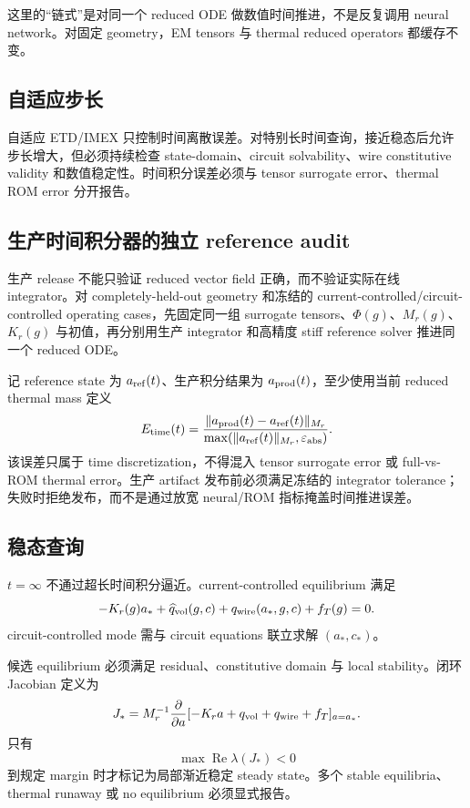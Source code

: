 这里的“链式”是对同一个 reduced ODE 做数值时间推进，不是反复调用 neural network。对固定 geometry，EM tensors 与 thermal reduced operators 都缓存不变。

\subsection{自适应步长}
自适应 ETD/IMEX 只控制时间离散误差。对特别长时间查询，接近稳态后允许步长增大，但必须持续检查 state-domain、circuit solvability、wire constitutive validity 和数值稳定性。时间积分误差必须与 tensor surrogate error、thermal ROM error 分开报告。

\subsection{生产时间积分器的独立 reference audit}
生产 release 不能只验证 reduced vector field 正确，而不验证实际在线 integrator。对 completely-held-out geometry 和冻结的 current-controlled/circuit-controlled operating cases，先固定同一组 surrogate tensors、$\Phi(g)$、$M_r(g)$、$K_r(g)$ 与初值，再分别用生产 integrator 和高精度 stiff reference solver 推进同一个 reduced ODE。

记 reference state 为 $a_{\rm ref}(t)$、生产积分结果为 $a_{\rm prod}(t)$，至少使用当前 reduced thermal mass 定义
\begin{equation}
E_{\rm time}(t)
=\frac{\|a_{\rm prod}(t)-a_{\rm ref}(t)\|_{M_r}}
{\max(\|a_{\rm ref}(t)\|_{M_r},\varepsilon_{\rm abs})}.
\end{equation}
该误差只属于 time discretization，不得混入 tensor surrogate error 或 full-vs-ROM thermal error。生产 artifact 发布前必须满足冻结的 integrator tolerance；失败时拒绝发布，而不是通过放宽 neural/ROM 指标掩盖时间推进误差。

\subsection{稳态查询}
$t=\infty$ 不通过超长时间积分逼近。current-controlled equilibrium 满足
\begin{equation}
-K_r(g)a_*+\widehat q_{\rm vol}(g,c)+q_{\rm wire}(a_*,g,c)+f_T(g)=0.
\end{equation}
circuit-controlled mode 需与 circuit equations 联立求解 $(a_*,c_*)$。

候选 equilibrium 必须满足 residual、constitutive domain 与 local stability。闭环 Jacobian 定义为
\begin{equation}
J_*=M_r^{-1}\frac{\partial}{\partial a}
[-K_ra+q_{\rm vol}+q_{\rm wire}+f_T]_{a=a_*}.
\end{equation}
只有
\begin{equation}
\max\operatorname{Re}\lambda(J_*)<0
\end{equation}
到规定 margin 时才标记为局部渐近稳定 steady state。多个 stable equilibria、thermal runaway 或 no equilibrium 必须显式报告。

